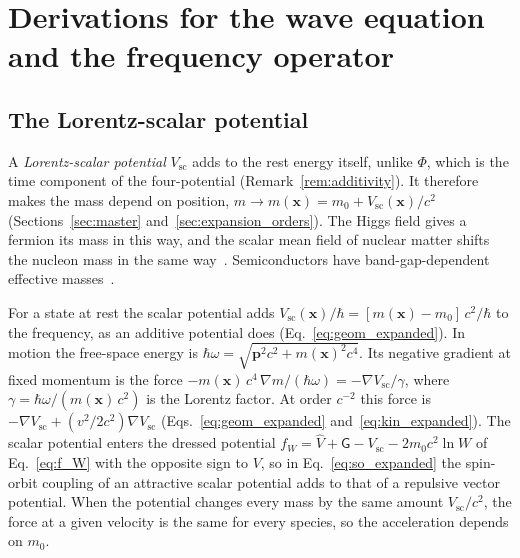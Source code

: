\documentclass[aps,prd,onecolumn,tightenlines,nofootinbib,notitlepage,11pt,floatfix]{revtex4-2}
\theoremstyle{indentedtheorem}
\begin{document}
\section{Derivations for the wave equation and the frequency operator}
\label{sup:master}

\subsection{The Lorentz-scalar potential}
\label{sup:lorentz_scalar}

A \emph{Lorentz-scalar potential} $V_\text{sc}$ adds to the rest energy itself, unlike $\Phi$, which is the time component of the four-potential (Remark~\ref{rem:additivity}). It therefore makes the mass depend on position, $m\to m(\mathbf{x})=m_0+V_\text{sc}(\mathbf{x})/c^2$ (Sections~\ref{sec:master} and~\ref{sec:expansion_orders}). The Higgs field gives a fermion its mass in this way, and the scalar mean field of nuclear matter shifts the nucleon mass in the same way~\citep{Walecka1974Theory}. Semiconductors have band-gap-dependent effective masses~\citep{Bastard1988Wave}.

For a state at rest the scalar potential adds $V_\text{sc}(\mathbf{x})/\hbar=[m(\mathbf{x})-m_0]\,c^2/\hbar$ to the frequency, as an additive potential does (Eq.~\eqref{eq:geom_expanded}). In motion the free-space energy is $\hbar\omega=\sqrt{\mathbf{p}^2c^2+m(\mathbf{x})^2c^4}$. Its negative gradient at fixed momentum is the force $-m(\mathbf{x})\,c^4\,\nabla m/(\hbar\omega)=-\nabla V_\text{sc}/\gamma$, where $\gamma=\hbar\omega/(m(\mathbf{x})\,c^2)$ is the Lorentz factor. At order $c^{-2}$ this force is $-\nabla V_\text{sc}+(v^2/2c^2)\nabla V_\text{sc}$ (Eqs.~\eqref{eq:geom_expanded} and~\eqref{eq:kin_expanded}). The scalar potential enters the dressed potential $f_W=\hat{V}+\mathsf{G}-V_\text{sc}-2m_0c^2\ln W$ of Eq.~\eqref{eq:f_W} with the opposite sign to $V$, so in Eq.~\eqref{eq:so_expanded} the spin-orbit coupling of an attractive scalar potential adds to that of a repulsive vector potential. When the potential changes every mass by the same amount $V_\text{sc}/c^2$, the force at a given velocity is the same for every species, so the acceleration depends on $m_0$.
\end{document}
